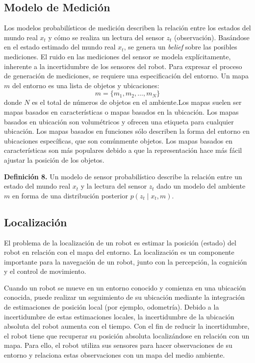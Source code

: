 \subsection{Modelo de Medición}

Los modelos probabilísticos de medición describen la relación entre los estados del mundo real $x_{t}$ y cómo se realiza un lectura del sensor $z_{t}$ (observación). Basándose en el estado estimado del mundo real $x_{t}$, se genera un \textit{belief} sobre las posibles mediciones. El ruido en las mediciones del sensor se modela explícitamente, inherente a la incertidumbre de los sensores del robot. Para expresar el proceso de generación de mediciones, se requiere una especificación del entorno. Un mapa $m$ del entorno es una lista de objetos y ubicaciones:
\begin{equation}
m =\{m_{1}, m_{2}, \ldots, m_{N}\}
\end{equation}
donde $N$ es el total de números de objetos en el ambiente.Los mapas suelen ser mapas basados en características o mapas basados en la ubicación. Los mapas basados en ubicación son volumétricos y ofrecen una etiqueta para cualquier ubicación. Los mapas basados en funciones sólo describen la forma del entorno en ubicaciones específicas, que son comúnmente objetos. Los mapas basados en características son más populares debido a que la representación hace más fácil ajustar la posición de los objetos.

\textbf{Definición 8.} Un modelo de sensor probabilístico describe la relación entre un estado del mundo real $x_{t}$ y la lectura del sensor $z_{t}$ dado un modelo del ambiente $m$ en forma de una distribución posterior $p(z_{t}\mid x_{t},m)$.

\subsection{Localización}
El problema de la localización de un robot es estimar la posición (estado) del robot en relación con el mapa del entorno. La localización es un componente importante para la navegación de un robot, junto con la percepción, la cognición y el control de movimiento.

Cuando un robot se mueve en un entorno conocido y comienza en una ubicación conocida, puede realizar un seguimiento de su ubicación mediante la integración de estimaciones de posición local (por ejemplo, odometría). Debido a la incertidumbre de estas estimaciones locales, la incertidumbre de la ubicación absoluta del robot aumenta con el tiempo. Con el fin de reducir la incertidumbre, el robot tiene que recuperar su posición absoluta localizándose en relación con un mapa. Para ello, el robot utiliza sus sensores para hacer observaciones de su entorno y relaciona estas observaciones con un mapa del medio ambiente.

